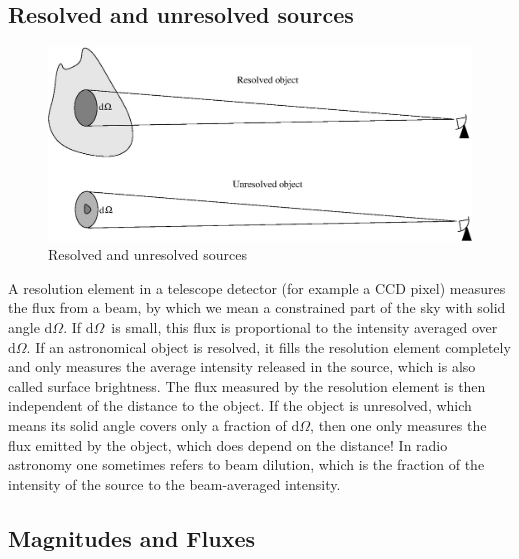 \documentclass[12pt]{article}
\numberwithin{equation}{section}
\def\dd{\mathrm{d}}
\def\dO{\ensuremath{\dd \Omega}}
\begin{document}
\subsection{Resolved and unresolved sources}

\begin{figure}
  \centering
  \includegraphics[width=12cm]{figs/resolved_unresolved}
  \caption{Resolved and unresolved sources
  \label{fig:resolved_unresolved}}
\end{figure}

A resolution element in a telescope detector (for example a CCD pixel) measures the flux from a beam, by which we mean a constrained part of the sky with solid angle \dO. If \dO\ is small, this flux is proportional to the intensity averaged over \dO. If an astronomical object is resolved, it fills the resolution element completely and only measures the average intensity released in the source, which is also called surface brightness. The flux measured by the resolution element is then independent of the distance to the object. If the object is unresolved, which means its solid angle covers only a fraction of \dO, then one only measures the flux emitted by the object, which does depend on the distance! In radio astronomy one sometimes refers to beam dilution, which is the fraction of the intensity of the source to the beam-averaged intensity.

\subsection{Magnitudes and Fluxes}
\end{document}
